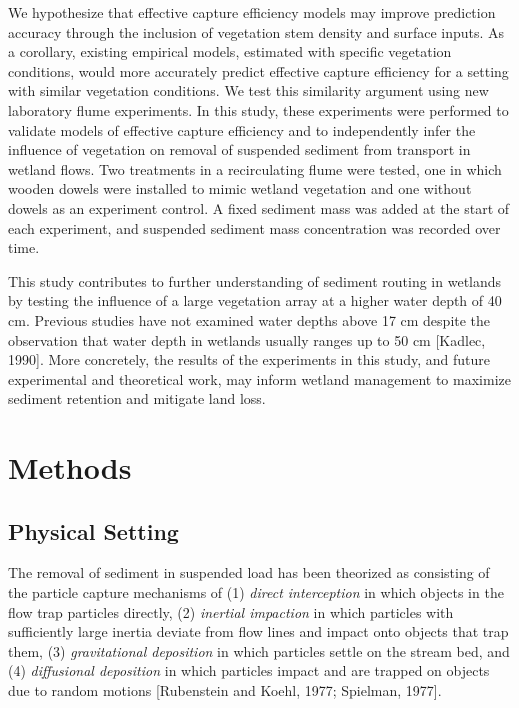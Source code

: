 \documentclass[12pt]{article}
\begin{document}
We hypothesize that effective capture efficiency models may improve prediction accuracy through the inclusion of vegetation stem density and surface inputs. As a corollary, existing empirical models, estimated with specific vegetation conditions, would more accurately predict effective capture efficiency for a setting with similar vegetation conditions. We test this similarity argument using new laboratory flume experiments. In this study, these experiments were performed to validate models of effective capture efficiency and to independently infer the influence of vegetation on removal of suspended sediment from transport in wetland flows. Two treatments in a recirculating flume were tested, one in which wooden dowels were installed to mimic wetland vegetation and one without dowels as an experiment control. A fixed sediment mass was added at the start of each experiment, and suspended sediment mass concentration was recorded over time.

This study contributes to further understanding of sediment routing in wetlands by testing the influence of a large vegetation array at a higher water depth of 40 cm. Previous studies have not examined water depths above 17 cm despite the observation that water depth in wetlands usually ranges up to 50 cm [Kadlec, 1990]. More concretely, the results of the experiments in this study, and future experimental and theoretical work, may inform wetland management to maximize sediment retention and mitigate land loss.

\section{Methods}

\subsection{Physical Setting}

The removal of sediment in suspended load has been theorized as consisting of the particle capture mechanisms of (1) \textit{direct interception} in which objects in the flow trap particles directly, (2) \textit{inertial impaction} in which particles with sufficiently large inertia deviate from flow lines and impact onto objects that trap them, (3) \textit{gravitational deposition} in which particles settle on the stream bed, and (4) \textit{diffusional deposition} in which particles impact and are trapped on objects due to random motions [Rubenstein and Koehl, 1977; Spielman, 1977].
\end{document}
